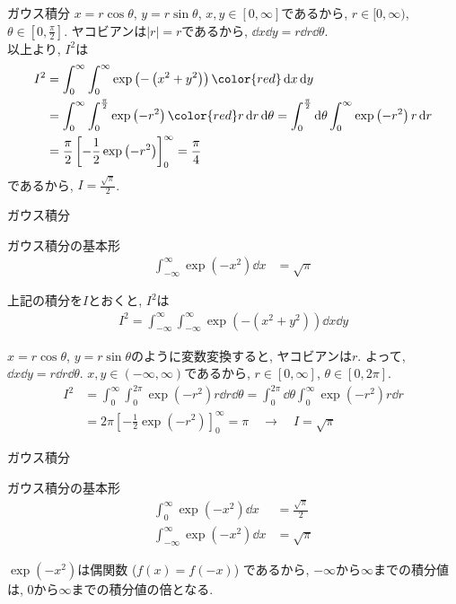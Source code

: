 \documentclass[dvipdfmx,notheorems,t]{beamer}
\begin{document}
\begin{frame}{ガウス積分}
$x = r \cos \theta$, $y = r \sin \theta$, $x, y \in [0, \infty]$であるから,
$r \in [0, \infty)$, $\theta \in [0, \frac{\pi}{2}]$.
ヤコビアンは$\left| r \right| = r$であるから, $\dd{x} \dd{y} = r \dd{r} \dd{\theta}$. \\

以上より, $I^2$は
\begin{align*}
  I^2 &= \int_0^\infty \int_0^\infty \exp \left( - \left( x^2 + y^2 \right) \right)
    {\color{red} \dd{x} \dd{y}} \\
    &= \int_0^\infty \int_0^\frac{\pi}{2} \exp \left( -r^2 \right)
    {\color{red} r \dd{r} \dd{\theta}}
    = \int_0^\frac{\pi}{2} \dd{\theta} \int_0^\infty \exp \left( -r^2 \right) r \dd{r} \\
    &= \frac{\pi}{2} \left[ -\frac{1}{2} \exp \left( -r^2 \right) \right]_0^\infty
    = \frac{\pi}{4}
\end{align*}
であるから, $I = \frac{\sqrt{\pi}}{2}$.
\end{frame}

\begin{frame}{ガウス積分}
\begin{block}{ガウス積分の基本形}
  \begin{align*}
    \int_{-\infty}^\infty \exp \left( -x^2 \right) \dd{x} &= \sqrt{\pi}
  \end{align*}
\end{block}

上記の積分を$I$とおくと, $I^2$は
\begin{align*}
  I^2 = \int_{-\infty}^\infty \int_{-\infty}^\infty
    \exp \left( - \left( x^2 + y^2 \right) \right) \dd{x} \dd{y}
\end{align*}

$x = r \cos \theta$, $y = r \sin \theta$のように変数変換すると, ヤコビアンは$r$.
よって, $\dd{x} \dd{y} = r \dd{r} \dd{\theta}$.
$x, y \in (-\infty, \infty)$であるから, $r \in [0, \infty]$, $\theta \in [0, 2\pi]$.
\begin{align*}
  I^2 &= \int_0^\infty \int_0^{2\pi} \exp \left( -r^2 \right) r \dd{r} \dd{\theta}
    = \int_0^{2\pi} \dd{\theta} \int_0^\infty \exp \left( -r^2 \right) r \dd{r} \\
    &= 2 \pi \left[ -\frac{1}{2} \exp \left( -r^2 \right) \right]_0^\infty
    = \pi \quad \longrightarrow \quad I = \sqrt{\pi}
\end{align*}
\end{frame}

\begin{frame}{ガウス積分}
\begin{block}{ガウス積分の基本形}
  \begin{align*}
    \int_0^\infty \exp \left( -x^2 \right) \dd{x} &= \frac{\sqrt{\pi}}{2} \\
    \int_{-\infty}^\infty \exp \left( -x^2 \right) \dd{x} &= \sqrt{\pi}
  \end{align*}
\end{block}

$\exp \left( -x^2 \right)$は偶関数 ($f(x) = f(-x)$) であるから,
$-\infty$から$\infty$までの積分値は, $0$から$\infty$までの積分値の倍となる.
\end{frame}
\end{document}
